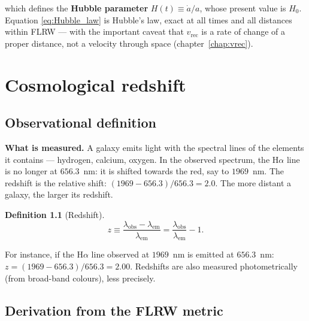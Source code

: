 \documentclass[11pt,a4paper,openany]{report}
\newcommand{\Hzero}{H_{0}}
\newcommand{\eqdef}{\equiv}
\newtheorem{definition}[theorem]{Definition}
\begin{document}
\noindent which defines the \textbf{Hubble parameter}
$H(t) \equiv \dot a/a$, whose present value is $\Hzero$. Equation
\eqref{eq:Hubble_law} is Hubble's law, exact at all times and all distances
within FLRW --- with the important caveat that $v_{\text{rec}}$ is a rate of
change of a proper distance, not a velocity through space
(chapter~\ref{chap:vrec}).

\chapter{Cosmological redshift}
\label{chap:redshift}

\section{Observational definition}

\begin{tcolorbox}[plain]
\textbf{What is measured.} A galaxy emits light with the spectral lines of the
elements it contains --- hydrogen, calcium, oxygen. In the observed spectrum,
the H$\alpha$ line is no longer at $656.3$~nm: it is shifted towards the red,
say to $1969$~nm. The redshift is the relative shift:
$(1969-656.3)/656.3 = 2.0$. The more distant a galaxy, the larger its redshift.
\end{tcolorbox}

\begin{definition}[Redshift]
\begin{equation}
z \eqdef \frac{\lambda_{\text{obs}} - \lambda_{\text{em}}}{\lambda_{\text{em}}}
  = \frac{\lambda_{\text{obs}}}{\lambda_{\text{em}}} - 1 .
\label{eq:z_def}
\end{equation}
\end{definition}

For instance, if the H$\alpha$ line observed at $1969$~nm is emitted at
$656.3$~nm: $z = (1969 - 656.3)/656.3 = 2.00$. Redshifts are also measured
photometrically (from broad-band colours), less precisely.

\section{Derivation from the FLRW metric}
\end{document}
